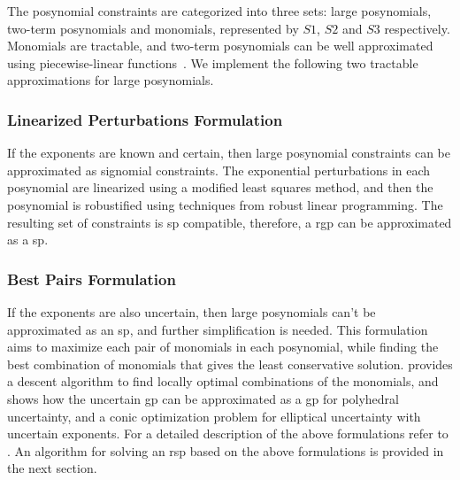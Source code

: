 The posynomial constraints are categorized into three sets: large posynomials, two-term posynomials and monomials,
represented by $S1$, $S2$ and $S3$ respectively.
Monomials are tractable, and two-term posynomials can be well approximated using piecewise-linear
functions~\cite{hsiung_kim_boyd_2007}.
We implement the following two tractable approximations for large posynomials.

\subsubsection{Linearized Perturbations Formulation}
If the exponents are known and certain, then large posynomial constraints can be approximated as signomial constraints.
The exponential perturbations in each posynomial are linearized using a modified least squares method, and then the
posynomial is robustified using techniques from robust linear programming. The resulting set of constraints is \gls{sp} compatible,
therefore, a \gls{rgp} can be approximated as a \gls{sp}.

\subsubsection{Best Pairs Formulation}
If the exponents are also uncertain, then large posynomials can't be approximated as an \gls{sp}, and further simplification is needed.
This formulation aims to maximize each pair of monomials in each posynomial,
while finding the best combination of monomials that gives the least conservative solution.
\cite{Saab2018} provides a descent algorithm to find locally optimal combinations of the monomials,
and shows how the uncertain \gls{gp} can be approximated as a \gls{gp} for polyhedral uncertainty,
and a conic optimization problem for elliptical uncertainty with uncertain exponents.
For a detailed description of the above formulations refer to \cite{Saab2018}.
An algorithm for solving an \gls{rsp} based on the above formulations is provided in the next section.
